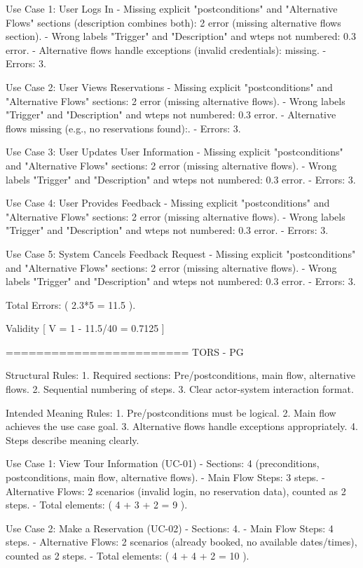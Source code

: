 Use Case 1: User Logs In
- Missing explicit "postconditions" and "Alternative Flows" sections (description combines both): 2 error (missing alternative flows section).
- Wrong labels "Trigger" and "Description" and wteps not numbered: 0.3 error.
- Alternative flows handle exceptions (invalid credentials): missing.
- Errors: 3.

Use Case 2: User Views Reservations
- Missing explicit "postconditions" and "Alternative Flows" sections: 2 error (missing alternative flows).
- Wrong labels "Trigger" and "Description" and wteps not numbered: 0.3 error.
- Alternative flows missing (e.g., no reservations found):.
- Errors: 3.

Use Case 3: User Updates User Information
- Missing explicit "postconditions" and "Alternative Flows" sections: 2 error (missing alternative flows).
- Wrong labels "Trigger" and "Description" and wteps not numbered: 0.3 error.
- Errors: 3.

Use Case 4: User Provides Feedback
- Missing explicit "postconditions" and "Alternative Flows" sections: 2 error (missing alternative flows).
- Wrong labels "Trigger" and "Description" and wteps not numbered: 0.3 error.
- Errors: 3.

Use Case 5: System Cancels Feedback Request
- Missing explicit "postconditions" and "Alternative Flows" sections: 2 error (missing alternative flows).
- Wrong labels "Trigger" and "Description" and wteps not numbered: 0.3 error.
- Errors: 3.

Total Errors: ( 2.3*5 = 11.5 ).

Validity
[
V = 1 - 11.5/40 = 0.7125
]

========================
TORS - PG

Structural Rules:
1. Required sections: Pre/postconditions, main flow, alternative flows.
2. Sequential numbering of steps.
3. Clear actor-system interaction format.

Intended Meaning Rules:
1. Pre/postconditions must be logical.
2. Main flow achieves the use case goal.
3. Alternative flows handle exceptions appropriately.
4. Steps describe meaning clearly.

Use Case 1: View Tour Information (UC-01)
- Sections: 4 (preconditions, postconditions, main flow, alternative flows).
- Main Flow Steps: 3 steps.
- Alternative Flows: 2 scenarios (invalid login, no reservation data), counted as 2 steps.
- Total elements: ( 4 + 3 + 2 = 9 ).

Use Case 2: Make a Reservation (UC-02)
- Sections: 4.
- Main Flow Steps: 4 steps.
- Alternative Flows: 2 scenarios (already booked, no available dates/times), counted as 2 steps.
- Total elements: ( 4 + 4 + 2 = 10 ).

